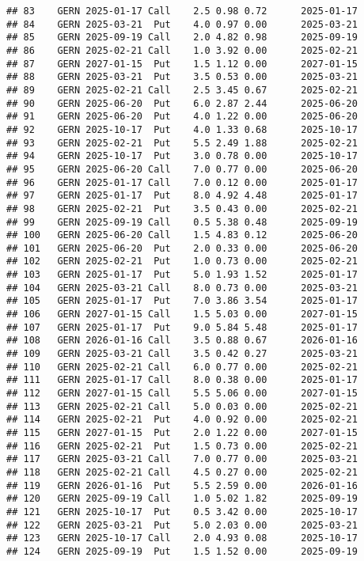 \documentclass[
]{article}
\begin{document}
\begin{verbatim}
## 83    GERN 2025-01-17 Call    2.5 0.98 0.72      2025-01-17
## 84    GERN 2025-03-21  Put    4.0 0.97 0.00      2025-03-21
## 85    GERN 2025-09-19 Call    2.0 4.82 0.98      2025-09-19
## 86    GERN 2025-02-21 Call    1.0 3.92 0.00      2025-02-21
## 87    GERN 2027-01-15  Put    1.5 1.12 0.00      2027-01-15
## 88    GERN 2025-03-21  Put    3.5 0.53 0.00      2025-03-21
## 89    GERN 2025-02-21 Call    2.5 3.45 0.67      2025-02-21
## 90    GERN 2025-06-20  Put    6.0 2.87 2.44      2025-06-20
## 91    GERN 2025-06-20  Put    4.0 1.22 0.00      2025-06-20
## 92    GERN 2025-10-17  Put    4.0 1.33 0.68      2025-10-17
## 93    GERN 2025-02-21  Put    5.5 2.49 1.88      2025-02-21
## 94    GERN 2025-10-17  Put    3.0 0.78 0.00      2025-10-17
## 95    GERN 2025-06-20 Call    7.0 0.77 0.00      2025-06-20
## 96    GERN 2025-01-17 Call    7.0 0.12 0.00      2025-01-17
## 97    GERN 2025-01-17  Put    8.0 4.92 4.48      2025-01-17
## 98    GERN 2025-02-21  Put    3.5 0.43 0.00      2025-02-21
## 99    GERN 2025-09-19 Call    0.5 5.38 0.48      2025-09-19
## 100   GERN 2025-06-20 Call    1.5 4.83 0.12      2025-06-20
## 101   GERN 2025-06-20  Put    2.0 0.33 0.00      2025-06-20
## 102   GERN 2025-02-21  Put    1.0 0.73 0.00      2025-02-21
## 103   GERN 2025-01-17  Put    5.0 1.93 1.52      2025-01-17
## 104   GERN 2025-03-21 Call    8.0 0.73 0.00      2025-03-21
## 105   GERN 2025-01-17  Put    7.0 3.86 3.54      2025-01-17
## 106   GERN 2027-01-15 Call    1.5 5.03 0.00      2027-01-15
## 107   GERN 2025-01-17  Put    9.0 5.84 5.48      2025-01-17
## 108   GERN 2026-01-16 Call    3.5 0.88 0.67      2026-01-16
## 109   GERN 2025-03-21 Call    3.5 0.42 0.27      2025-03-21
## 110   GERN 2025-02-21 Call    6.0 0.77 0.00      2025-02-21
## 111   GERN 2025-01-17 Call    8.0 0.38 0.00      2025-01-17
## 112   GERN 2027-01-15 Call    5.5 5.06 0.00      2027-01-15
## 113   GERN 2025-02-21 Call    5.0 0.03 0.00      2025-02-21
## 114   GERN 2025-02-21  Put    4.0 0.92 0.00      2025-02-21
## 115   GERN 2027-01-15  Put    2.0 1.22 0.00      2027-01-15
## 116   GERN 2025-02-21  Put    1.5 0.73 0.00      2025-02-21
## 117   GERN 2025-03-21 Call    7.0 0.77 0.00      2025-03-21
## 118   GERN 2025-02-21 Call    4.5 0.27 0.00      2025-02-21
## 119   GERN 2026-01-16  Put    5.5 2.59 0.00      2026-01-16
## 120   GERN 2025-09-19 Call    1.0 5.02 1.82      2025-09-19
## 121   GERN 2025-10-17  Put    0.5 3.42 0.00      2025-10-17
## 122   GERN 2025-03-21  Put    5.0 2.03 0.00      2025-03-21
## 123   GERN 2025-10-17 Call    2.0 4.93 0.08      2025-10-17
## 124   GERN 2025-09-19  Put    1.5 1.52 0.00      2025-09-19

\end{verbatim}
\end{document}

